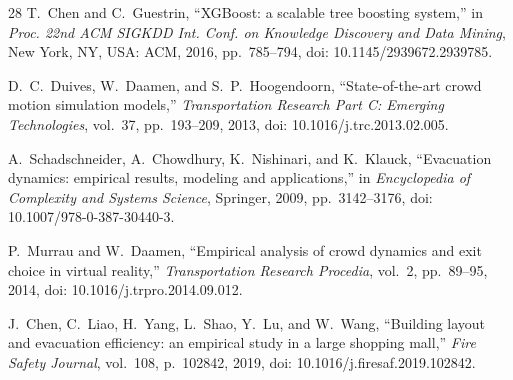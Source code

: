 \documentclass[conference]{IEEEtran}
\begin{document}
\begin{thebibliography}{28}
T.~Chen and C.~Guestrin, ``XGBoost: a scalable tree boosting system,'' in \emph{Proc. 22nd ACM SIGKDD Int. Conf. on Knowledge Discovery and Data Mining}, New York, NY, USA: ACM, 2016, pp.~785--794, doi: 10.1145/2939672.2939785.

D.~C.~Duives, W.~Daamen, and S.~P.~Hoogendoorn, ``State-of-the-art crowd motion simulation models,'' \emph{Transportation Research Part C: Emerging Technologies}, vol.~37, pp.~193--209, 2013, doi: 10.1016/j.trc.2013.02.005.

A.~Schadschneider, A.~Chowdhury, K.~Nishinari, and K.~Klauck, ``Evacuation dynamics: empirical results, modeling and applications,'' in \emph{Encyclopedia of Complexity and Systems Science}, Springer, 2009, pp.~3142--3176, doi: 10.1007/978-0-387-30440-3.

P.~Murrau and W.~Daamen, ``Empirical analysis of crowd dynamics and exit choice in virtual reality,'' \emph{Transportation Research Procedia}, vol.~2, pp.~89--95, 2014, doi: 10.1016/j.trpro.2014.09.012.

J.~Chen, C.~Liao, H.~Yang, L.~Shao, Y.~Lu, and W.~Wang, ``Building layout and evacuation efficiency: an empirical study in a large shopping mall,'' \emph{Fire Safety Journal}, vol.~108, p.~102842, 2019, doi: 10.1016/j.firesaf.2019.102842.

\end{thebibliography}
\end{document}
